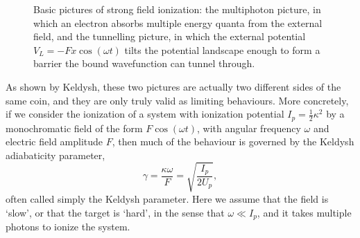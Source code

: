\begin{figure}[h]
  \centering
  \hspace{3mm}
  \caption[Basic pictures of strong field ionization]{
  Basic pictures of strong field ionization: \protect{} the multiphoton picture, in which an electron absorbs multiple energy quanta from the external field, and \protect{} the tunnelling picture, in which the external potential $V_L = -Fx\cos(\omega t)$ tilts the potential landscape enough to form a barrier the bound wavefunction can tunnel through.
  }
\label{f1-basic-pictures}
\end{figure}

As shown by Keldysh, these two pictures are actually two different sides of the same coin, and they are only truly valid  as limiting behaviours. More concretely, if we consider the ionization of a system with ionization potential $I_p=\frac12 \kappa^2$ by a monochromatic field of the form $F\cos(\omega t)$, with angular frequency $\omega$ and electric field amplitude $F$, then much of the behaviour is governed by the Keldysh adiabaticity parameter,
\begin{equation}
\gamma = \frac{\kappa \omega}{F} = \sqrt{\frac{I_p}{2U_p}},
\label{e1-keldysh-parameter}
\end{equation}
often called simply the Keldysh parameter. Here we assume that the field is `slow', or that the target is `hard', in the sense that $\omega\ll I_p$, and it takes multiple photons to ionize the system. 

